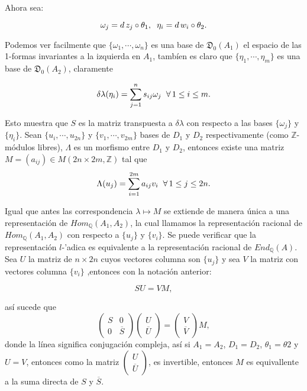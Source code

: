 \documentclass[letterpaper]{report}
\newcommand{\rac}{\ensuremath{ \mathbb Q }}
\newcommand{\dbz}{\ensuremath{ \mathbb Z }}
\begin{document}
Ahora sea:

$$\omega_j=d\,z_j\circ\theta_1,\hspace{0.2cm}\eta_i=d\,w_i\circ\theta_2.$$

Podemos ver facilmente que $\lbrace \omega_1,\cdots,\omega_n\rbrace$ es una base de $\mathfrak{D}_0(A_1)$ el espacio de las 1-formas invariantes a la izquierda en $A_1$, tambíen es claro que $\lbrace \eta_1,\cdots,\eta_m\rbrace$ es una base de $\mathfrak{D}_0(A_2)$, claramente

$$\delta\lambda(\eta_i)=\sum_{j=1}^n s_{ij}\omega_j\hspace{0.2cm}\forall\, 1\leq i\leq m.$$

Esto muestra que $S$ es la matriz transpuesta a $\delta\lambda$ con respecto a las bases $\lbrace\omega_j\rbrace$ y $\lbrace\eta_i\rbrace$.
Sean $\lbrace u_i,\cdots,u_{2n}\rbrace$ y $\lbrace v_1,\cdots,v_{2m}\rbrace$ bases de $D_1$ y $D_2$ respectivamente (como $\dbz$-módulos libres), $\Lambda$ es un morfismo entre $D_1$ y $D_2$, entonces existe una matriz $M=(a_{ij})\in M(2n\times 2m,\dbz)$ tal que
$$\Lambda(u_j)=\sum_{i=1}^{2m} a_{ij} v_i\hspace{0.2cm}\forall\, 1\leq j\leq 2n.$$

Igual que antes las correspondencia $\lambda\mapsto M$ se extiende de manera única a una representación de $Hom_{\rac}(A_1,A_2)$, la cual llamamos la representación racional de $Hom_{\rac}(A_1,A_2)$ con respecto a $\lbrace u_j\rbrace$ y $\lbrace v_i\rbrace$. Se puede verificar que la representación $l$-'adica es equivalente a la representación racional de $End_{\rac}(A)$. Sea $U$ la matriz de $n\times 2n$ cuyos vectores columna son $\lbrace u_j\rbrace$ y sea $V$ la matriz con vectores columna $\lbrace v_i\rbrace$ ,entonces con la notación anterior:

$$SU=VM,$$

\noindent así sucede que
\begin{equation}
	\begin{pmatrix}
		S & 0\\
		0 & \overline{S}
	\end{pmatrix}
		\begin{pmatrix}
		U\\
		\overline{U}
	\end{pmatrix}
	=
		\begin{pmatrix}
		V\\
		\overline{V}
	\end{pmatrix}M,
\end{equation}
\noindent donde la línea significa conjugación compleja, así si $A_1=A_2$, $D_1=D_2$, $\theta_1=\theta2$ y $U=V$, entonces como la matriz 
$\begin{pmatrix}
		U\\
		\overline{U}
\end{pmatrix}$,
es invertible, entonces $M$ es equivallente a la suma directa de $S$ y $\overline{S}$.
\end{document}
